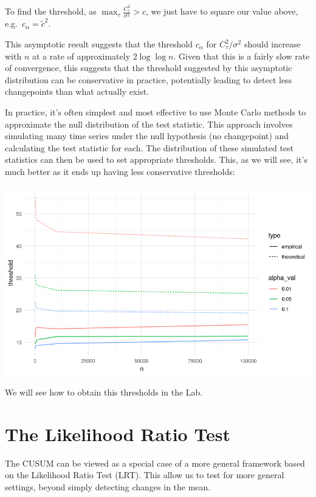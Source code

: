 \documentclass[
  letterpaper,
  DIV=11,
  numbers=noendperiod]{scrreprt}
\begin{document}
To find the threshold, as
\(\max_\tau \frac{C_{\tau}^2 }{\sigma^2} > c\), we just have to square
our value above, e.g.~\(c_\alpha = \tilde{c}^2\).

This asymptotic result suggests that the threshold \(c_\alpha\) for
\(C_τ^2/σ^2\) should increase with \(n\) at a rate of approximately
\(2 \log \log n\). Given that this is a fairly slow rate of convergence,
this suggests that the threshold suggested by this asymptotic
distribution can be conservative in practice, potentially leading to
detect less changepoints than what actually exist.

In practice, it's often simplest and most effective to use Monte Carlo
methods to approximate the null distribution of the test statistic. This
approach involves simulating many time series under the null hypothesis
(no changepoint) and calculating the test statistic for each. The
distribution of these simulated test statistics can then be used to set
appropriate thresholds. This, as we will see, it's much better as it
ends up having less conservative thresholds:

\includegraphics{source_imgs/empirical_thres_comparison.png}

We will see how to obtain this thresholds in the Lab.

\section{The Likelihood Ratio Test}\label{the-likelihood-ratio-test}

The CUSUM can be viewed as a special case of a more general framework
based on the Likelihood Ratio Test (LRT). This allow us to test for more
general settings, beyond simply detecting changes in the mean.
\end{document}
